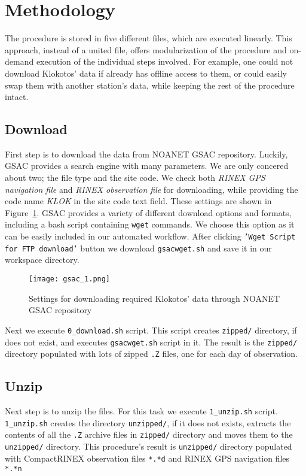 \documentclass[
12pt, %
a4paper, %
oneside, %
headinclude,footinclude, %
BCOR5mm, %
]{article}
\begin{document}
\section{Methodology}

The procedure is stored in five different files, which are executed linearly. This approach, instead of a united file, offers modularization of the procedure and on-demand execution of the individual steps involved. For example, one could not download Klokotos' data if already has offline access to them, or could easily swap them with another station's data, while keeping the rest of the procedure intact.

\subsection{Download}
First step is to download the data from NOANET GSAC repository. Luckily, GSAC provides a search engine with many parameters. We are only concered about two; the file type and the site code. We check both \textit{RINEX GPS navigation file} and \textit{RINEX observation file} for downloading, while providing the code name \textit{KLOK} in the site code text field. These settings are shown in Figure~\ref{fig:gsac1}. GSAC provides a variety of different download options and formats, including a bash script containing \texttt{wget} commands. We choose this option as it can be easily included in our automated workflow. After clicking \texttt{'Wget Script for FTP download'} button we download \texttt{gsacwget.sh} and save it in our workspace directory.

\begin{figure}[h!]
\centering
\texttt{[image: gsac\_1.png]}
\caption[text]{Settings for downloading required Klokotos' data through NOANET GSAC repository}
\label{fig:gsac1}
\end{figure}

Next we execute \texttt{0\_download.sh} script. This script creates \texttt{zipped/} directory, if does not exist, and executes \texttt{gsacwget.sh} script in it. The result is the \texttt{zipped/} directory populated with lots of zipped \texttt{.Z} files, one for each day of observation.

\vfill

\vspace*{25pt}


\subsection{Unzip}
Next step is to unzip the files. For this task we execute \texttt{1\_unzip.sh} script. \texttt{1\_unzip.sh} creates the directory \texttt{unzipped/}, if it does not exists, extracts the contents of all the \texttt{.Z} archive files in \texttt{zipped/} directory and moves them to the \texttt{unzipped/} directory. This procedure's result is \texttt{unzipped/} directory populated with CompactRINEX observation files \texttt{*.*d} and RINEX GPS navigation files \texttt{*.*n}
\end{document}
